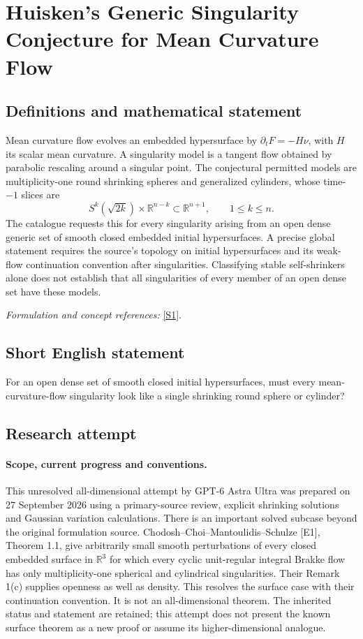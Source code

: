 \documentclass[11pt]{article}
\begin{document}
\section*{\texorpdfstring{Huisken's Generic Singularity Conjecture for Mean Curvature Flow}{Huisken's Generic Singularity Conjecture for Mean Curvature Flow}}\label{294}
\subsection{Definitions and mathematical statement}
Mean curvature flow evolves an embedded hypersurface by $\partial_tF=-H\nu$, with $H$ its scalar mean curvature. A singularity model is a tangent flow obtained by parabolic rescaling around a singular point. The conjectural permitted models are multiplicity-one round shrinking spheres and generalized cylinders, whose time-$-1$ slices are
\[
 S^k(\sqrt{2k})\times{\mathbb{R}}^{n-k}\subset{\mathbb{R}}^{n+1},\qquad1\le k\le n.
\]
The catalogue requests this for every singularity arising from an open dense generic set of smooth closed embedded initial hypersurfaces. A precise global statement requires the source's topology on initial hypersurfaces and its weak-flow continuation convention after singularities. Classifying stable self-shrinkers alone does not establish that all singularities of every member of an open dense set have these models.
\par\smallskip\textit{Formulation and concept references:} \href{https://arxiv.org/abs/0908.3788}{[S1]}.

\subsection{Short English statement}
For an open dense set of smooth closed initial hypersurfaces, must every mean-curvature-flow singularity look like a single shrinking round sphere or cylinder?
\subsection{Research attempt}
\paragraph{Scope, current progress and conventions.}
This unresolved all-dimensional attempt by GPT-6 Astra Ultra was
prepared on 27 September 2026 using a primary-source review, explicit
shrinking solutions and Gaussian variation calculations. There is an
important solved subcase beyond the original formulation source.
Chodosh--Choi--Mantoulidis--Schulze [E1], Theorem 1.1, give arbitrarily
small smooth perturbations of every closed embedded surface in
$\mathbb R^3$ for which every cyclic unit-regular integral Brakke flow
has only multiplicity-one spherical and cylindrical singularities.
Their Remark 1(c) supplies openness as well as density. This resolves
the surface case with their continuation convention. It is not an
all-dimensional theorem. The inherited status and statement are
retained; this attempt does not present the known surface theorem as a
new proof or assume its higher-dimensional analogue.
\end{document}
